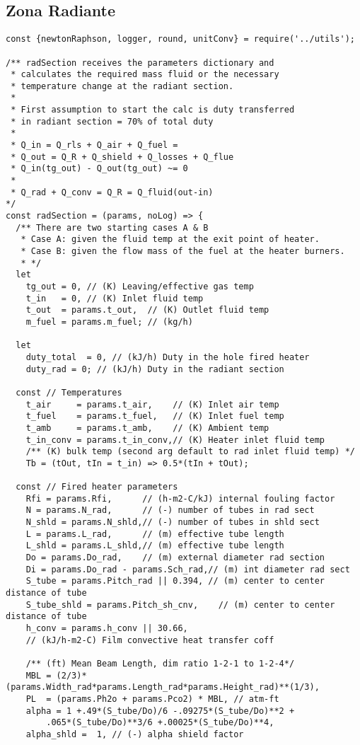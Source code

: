 \subsection{Zona Radiante}
\begin{verbatim}
const {newtonRaphson, logger, round, unitConv} = require('../utils');

/** radSection receives the parameters dictionary and
 * calculates the required mass fluid or the necessary
 * temperature change at the radiant section.
 * 
 * First assumption to start the calc is duty transferred
 * in radiant section = 70% of total duty
 * 
 * Q_in = Q_rls + Q_air + Q_fuel =
 * Q_out = Q_R + Q_shield + Q_losses + Q_flue
 * Q_in(tg_out) - Q_out(tg_out) ~= 0
 * 
 * Q_rad + Q_conv = Q_R = Q_fluid(out-in)
*/
const radSection = (params, noLog) => {
  /** There are two starting cases A & B
   * Case A: given the fluid temp at the exit point of heater.
   * Case B: given the flow mass of the fuel at the heater burners. 
   * */
  let 
    tg_out = 0, // (K) Leaving/effective gas temp
    t_in   = 0, // (K) Inlet fluid temp
    t_out  = params.t_out,  // (K) Outlet fluid temp
    m_fuel = params.m_fuel; // (kg/h)

  let 
    duty_total  = 0, // (kJ/h) Duty in the hole fired heater
    duty_rad = 0; // (kJ/h) Duty in the radiant section
  
  const // Temperatures
    t_air     = params.t_air,    // (K) Inlet air temp
    t_fuel    = params.t_fuel,   // (K) Inlet fuel temp
    t_amb     = params.t_amb,    // (K) Ambient temp
    t_in_conv = params.t_in_conv,// (K) Heater inlet fluid temp
    /** (K) bulk temp (second arg default to rad inlet fluid temp) */
    Tb = (tOut, tIn = t_in) => 0.5*(tIn + tOut);

  const // Fired heater parameters
    Rfi = params.Rfi,      // (h-m2-C/kJ) internal fouling factor
    N = params.N_rad,      // (-) number of tubes in rad sect
    N_shld = params.N_shld,// (-) number of tubes in shld sect
    L = params.L_rad,      // (m) effective tube length
    L_shld = params.L_shld,// (m) effective tube length
    Do = params.Do_rad,    // (m) external diameter rad section
    Di = params.Do_rad - params.Sch_rad,// (m) int diameter rad sect
    S_tube = params.Pitch_rad || 0.394, // (m) center to center distance of tube
    S_tube_shld = params.Pitch_sh_cnv,    // (m) center to center distance of tube
    h_conv = params.h_conv || 30.66, 
    // (kJ/h-m2-C) Film convective heat transfer coff

    /** (ft) Mean Beam Length, dim ratio 1-2-1 to 1-2-4*/
    MBL = (2/3)*(params.Width_rad*params.Length_rad*params.Height_rad)**(1/3),
    PL  = (params.Ph2o + params.Pco2) * MBL, // atm-ft
    alpha = 1 +.49*(S_tube/Do)/6 -.09275*(S_tube/Do)**2 +
        .065*(S_tube/Do)**3/6 +.00025*(S_tube/Do)**4,
    alpha_shld =  1, // (-) alpha shield factor
    

\end{verbatim}
